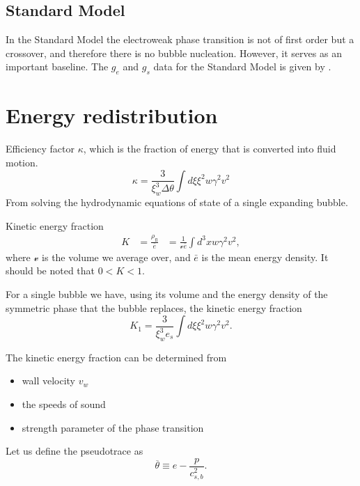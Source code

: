 \subsection{Standard Model}
In the Standard Model the electroweak phase transition is not of first order but a crossover,
and therefore there is no bubble nucleation.
However, it serves as an important baseline.
The $g_e$ and $g_s$ data for the Standard Model is given by \cite{borsanyi_lattice_2016}.


\section{Energy redistribution}
Efficiency factor $\kappa$, which is the fraction of energy that is converted into fluid motion.
\begin{equation}
\kappa = \frac{3}{\xi_w^3 \Delta \theta} \int d\xi \xi^2 w \gamma^2 v^2
\end{equation}
From solving the hydrodynamic equations of state of a single expanding bubble.

Kinetic energy fraction
\cites[eq. 7.36]{lecture_notes}[eq. 5]{giese_2020}
\begin{align}
K
&= \frac{\rho_\text{fl}}{\bar{e}}
&= \frac{1}{\mathcal{v} \bar{e}} \int d^3 x w \gamma^2 v^2,
\end{align}
where $\mathcal{v}$ is the volume we average over, and $\bar{e}$ is the mean energy density.
It should be noted that $0 < K < 1$.
\cite{giese_2020}

For a single bubble we have, using its volume and the energy density of the symmetric phase that the bubble replaces, the kinetic energy fraction
\cites[eq. 7.37]{lecture_notes}[eq. 5]{giese_2020}
\begin{equation}
K_1 = \frac{3}{\xi_w^3 e_s} \int d\xi \xi^2 w \gamma^2 v^2.
\end{equation}

The kinetic energy fraction can be determined from
\begin{itemize}
\item wall velocity $v_w$
\item the speeds of sound
\item strength parameter of the phase transition
\end{itemize}

Let us define the pseudotrace as
\cites[eq. 34]{giese_2020}[eq. 1]{giese_2021}
\begin{equation}
\overline{\theta} \equiv e - \frac{p}{c_{s,b}^2}.
\end{equation}

